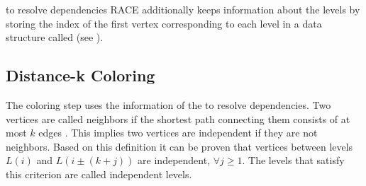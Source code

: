 \Inorder to resolve dependencies \acrshort{RACE} additionally keeps information
about the levels by storing the index of the first vertex corresponding
to each level in a data structure called \levelPtr (see ).

\subsection{Distance-k Coloring}
The \DK coloring step uses the information of the \levelPtr to resolve
dependencies. Two vertices are called \DK neighbors if the shortest path connecting 
them consists of at most $k$ edges \cite{dist_k_def}. This implies two vertices
 are \DK independent if they are not \DK neighbors. Based on this definition
 it can be proven that vertices between levels $L(i)$ and $L(i \pm (k+j))$ are
 \DK independent, $\forall j\ge1$. The levels that satisfy this criterion
 are called \DK independent levels.
 
